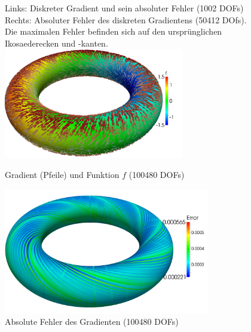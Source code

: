 \begin{figure}
              {Links: Diskreter Gradient und sein absoluter Fehler (1002 DOFs)
               Rechts: Absoluter Fehler des diskreten Gradientens (50412 DOfs).
                       Die maximalen Fehler befinden sich auf den ursprünglichen Ikosaederecken und -kanten.}
      \label{figGradSphere}
      \centering\includegraphics[width=0.7\textwidth]{bilder/gradTorus/gradAndF_100k.png}
      \caption[Gradient auf Torus]{Gradient (Pfeile) und Funktion \( f \) (100480 DOFs)}
      \label{figGradTorus}
      \centering\includegraphics[width=0.8\textwidth]{bilder/gradTorus/Error_100k.png}
      \caption[Gradient auf Torus (Fehler)]{Absolute Fehler des Gradienten (100480 DOFs)}
      \label{figGradTorusError}
    \end{figure}

